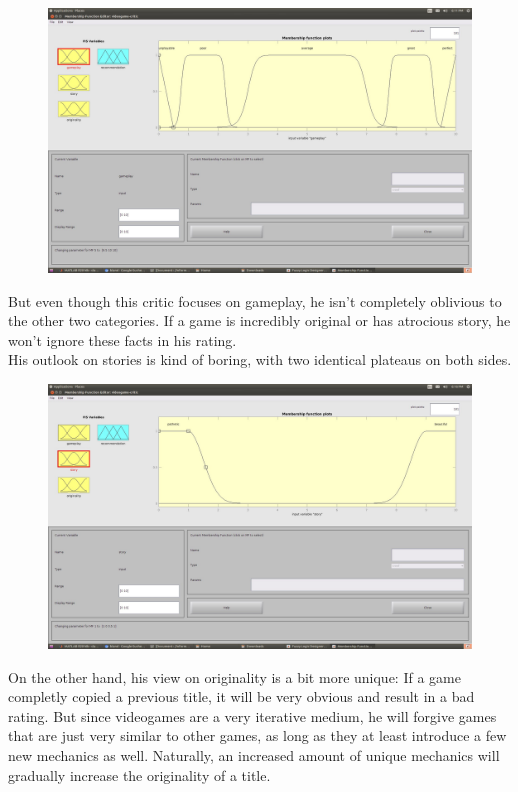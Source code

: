 \documentclass[a4paper, 11pt]{article}
\begin{document}
\begin{figure}[ht]
\includegraphics[scale=0.15]{vg-mf-gameplay.jpg}
\end{figure}

But even though this critic focuses on gameplay, he isn't completely oblivious to the other two categories. If a game is incredibly original or has atrocious story, he won't ignore these facts in his rating. \\
His outlook on stories is kind of boring, with two identical plateaus on both sides.

\begin{figure}[ht]
\includegraphics[scale=0.15]{vg-mf-story.jpg}
\end{figure}

\newpage

On the other hand, his view on originality is a bit more unique: If a game completly copied a previous title, it will be very obvious and result in a bad rating. But since videogames are a very iterative medium, he will forgive games that are just very similar to other games, as long as they at least introduce a few new mechanics as well. Naturally, an increased amount of unique mechanics will gradually increase the originality of a title.
\end{document}
